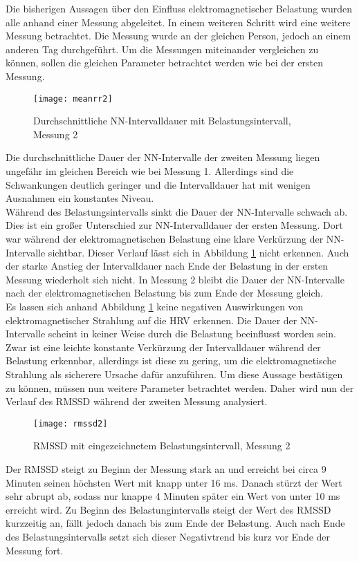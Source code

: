Die bisherigen Aussagen über den Einfluss elektromagnetischer Belastung wurden alle anhand einer Messung abgeleitet. In einem weiteren Schritt wird eine weitere Messung betrachtet. Die Messung wurde an der gleichen Person, jedoch an einem anderen Tag durchgeführt. Um die Messungen miteinander vergleichen zu können, sollen die gleichen Parameter betrachtet werden wie bei der ersten Messung.
\begin{figure}[H]
	\centering
	\texttt{[image: meanrr2]}
	\caption{Durchschnittliche NN-Intervalldauer mit Belastungsintervall, Messung 2}
	\label{fig:meanrr2}
\end{figure}
Die durchschnittliche Dauer der NN-Intervalle der zweiten Messung liegen ungefähr im gleichen Bereich wie bei Messung 1. Allerdings sind die Schwankungen deutlich geringer und die Intervalldauer hat mit wenigen Ausnahmen ein konstantes Niveau. \\
Während des Belastungsintervalls sinkt die Dauer der NN-Intervalle schwach ab. Dies ist ein großer Unterschied zur NN-Intervalldauer der ersten Messung. Dort war während der elektromagnetischen Belastung eine klare Verkürzung der NN-Intervalle sichtbar. Dieser Verlauf lässt sich in Abbildung \ref{fig:meanrr2} nicht erkennen. Auch der starke Anstieg der Intervalldauer nach Ende der Belastung  in der ersten Messung wiederholt sich nicht. In Messung 2 bleibt die Dauer der NN-Intervalle nach der elektromagnetischen Belastung bis zum Ende der Messung gleich.\\
Es lassen sich anhand Abbildung \ref{fig:meanrr2} keine negativen Auswirkungen von elektromagnetischer Strahlung auf die \acs{HRV} erkennen. Die Dauer der NN-Intervalle scheint in keiner Weise durch die Belastung beeinflusst worden sein. Zwar ist eine leichte konstante Verkürzung der Intervalldauer während der Belastung erkennbar, allerdings ist diese zu gering, um die elektromagnetische Strahlung als sicherere Ursache dafür anzuführen. Um diese Aussage bestätigen zu können, müssen nun weitere Parameter betrachtet werden. Daher wird nun der Verlauf des \acs{RMSSD} während der zweiten Messung analysiert.
\begin{figure}[H]
	\centering
	\texttt{[image: rmssd2]}
	\caption{RMSSD mit eingezeichnetem Belastungsintervall, Messung 2}
	\label{fig:rmssd2}
\end{figure}
Der \acs{RMSSD} steigt zu Beginn der Messung stark an und erreicht bei circa 9 Minuten seinen höchsten Wert mit knapp unter 16 ms. Danach stürzt der Wert sehr abrupt ab, sodass nur knappe 4 Minuten später ein Wert von unter 10 ms erreicht wird. Zu Beginn des Belastungintervalls steigt der Wert des \acs{RMSSD} kurzzeitig an, fällt jedoch danach bis zum Ende der Belastung. Auch nach Ende des Belastungsintervalls setzt sich dieser Negativtrend bis kurz vor Ende der Messung fort.\\

